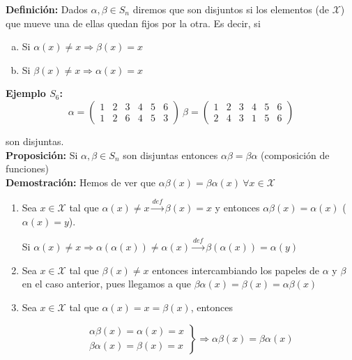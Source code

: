 \documentclass{article}
\begin{document}
\textbf{Definición:} Dados $\alpha,\beta \in S_n$ diremos que son disjuntos si los elementos (de $\mathcal{X}$) que mueve una de ellas quedan fijos por la otra. Es decir, si 

\begin{enumerate}[a)]
\item Si $\alpha(x) \neq x \Rightarrow \beta(x)=x$
\item Si $\beta(x) \neq x \Rightarrow \alpha(x)=x$
\end{enumerate}

\textbf{Ejemplo $S_6$:}
\begin{equation*}
\alpha=
\begin{pmatrix}
1 & 2 & 3 & 4 & 5 & 6 \\
1 & 2 & 6 & 4 & 5 & 3
\end{pmatrix}
~\beta=
\begin{pmatrix}
1 & 2 & 3 & 4 & 5 & 6 \\
2 & 4 & 3 & 1 & 5 & 6
\end{pmatrix}
\end{equation*}

son disjuntas. \\

\textbf{Proposición:} Si $\alpha,\beta \in S_n$ son disjuntas entonces $\alpha\beta=\beta\alpha$ (composición de funciones) \\

\textbf{Demostración:} Hemos de ver que $\alpha\beta(x)=\beta\alpha(x)~\forall x \in \mathcal{X}$

\begin{enumerate}[\bfseries C{a}so 1:]
\item Sea $x \in \mathcal{X}$ tal que $\alpha(x)\neq x \xrightarrow{def} \beta(x)=x$ y entonces $ \alpha\beta(x)=\alpha(x)$ ($\alpha(x)=y$). 

Si $\alpha(x)\neq x \Rightarrow \alpha(\alpha(x))\neq \alpha(x) \xrightarrow{def} \beta(\alpha(x))=\alpha(y)$

\item Sea $x \in \mathcal{X}$ tal que $\beta(x)\neq x$ entonces intercambiando los papeles de $\alpha$ y $\beta$ en el caso anterior, pues llegamos a que $\beta\alpha(x)=\beta(x)=\alpha\beta(x)$

\item Sea $x \in \mathcal{X}$ tal que $\alpha(x)=x=\beta(x)$, entonces 

\begin{equation*}
\left.\begin{array}{c}
\alpha\beta(x)=\alpha(x)=x \\
\beta\alpha(x)=\beta(x)=x 
\end{array}\right\rbrace
\Rightarrow \alpha\beta(x)=\beta\alpha(x)
\end{equation*}
\end{enumerate}
\end{document}
